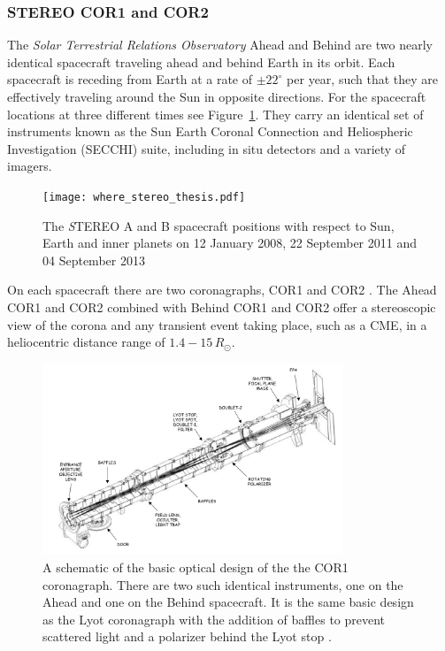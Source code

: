 \subsubsection{STEREO COR1 and COR2}\label{sec:22}
The \emph{Solar Terrestrial Relations Observatory} \citep[\emph{STEREO};][]{kai08} Ahead and Behind are two nearly identical spacecraft traveling ahead and behind Earth in its orbit. Each spacecraft is receding from Earth at a rate of $\pm22^{\circ}$ per year, such that they are effectively traveling around the Sun in opposite directions. For the spacecraft locations at three different times see Figure~\ref{fig:where_str}. They carry an identical set of instruments known as the Sun Earth Coronal Connection and Heliospheric Investigation (SECCHI) suite, including in situ detectors and a variety of imagers.
\begin{figure}
\centering
\texttt{[image: where\_stereo\_thesis.pdf]}
\caption[STEREO spacecraft positions]{The {\emph STEREO} A and B spacecraft positions with respect to Sun, Earth and inner planets on 12 January 2008, 22 September 2011 and 04 September 2013}
\label{fig:where_str}
\end{figure}
On each spacecraft there are two coronagraphs, COR1 and COR2 \citep{how08}. The Ahead COR1 and COR2 combined with Behind COR1 and COR2 offer a stereoscopic view of the corona and any transient event taking place, such as a CME, in a heliocentric distance range of $1.4-15\,R_{\odot}$.
\begin{figure}[!t]
\begin{center}
\includegraphics[width=0.8\textwidth, trim=0cm 0cm 0cm 1cm]{images/COR1_design}
\caption[The COR1 coronagraph]{A schematic of the basic optical design of the the COR1 coronagraph. There are two such identical instruments, one on the Ahead and one on the Behind spacecraft. It is the same basic design as the Lyot coronagraph with the addition of baffles to prevent scattered light and a polarizer behind the Lyot stop \citep{thomp2008}.}
\label{fig:COR1_design}
\end{center}
\end{figure}
